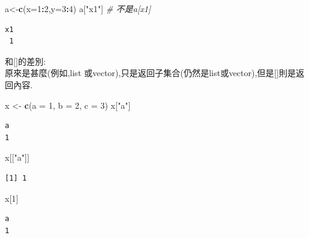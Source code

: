 \documentclass[]{book}
\newenvironment{Shaded}{\begin{snugshade}}{\end{snugshade}}
\newcommand{\CommentTok}[1]{\textcolor[rgb]{0.56,0.35,0.01}{\textit{#1}}}
\newcommand{\DataTypeTok}[1]{\textcolor[rgb]{0.13,0.29,0.53}{#1}}
\newcommand{\DecValTok}[1]{\textcolor[rgb]{0.00,0.00,0.81}{#1}}
\newcommand{\KeywordTok}[1]{\textcolor[rgb]{0.13,0.29,0.53}{\textbf{#1}}}
\newcommand{\NormalTok}[1]{#1}
\newcommand{\OperatorTok}[1]{\textcolor[rgb]{0.81,0.36,0.00}{\textbf{#1}}}
\newcommand{\StringTok}[1]{\textcolor[rgb]{0.31,0.60,0.02}{#1}}
\theoremstyle{definition}
\theoremstyle{definition}
\theoremstyle{definition}
\theoremstyle{remark}
\begin{document}
\begin{Shaded}
\begin{Highlighting}[]
\NormalTok{a<-}\KeywordTok{c}\NormalTok{(}\DataTypeTok{x=}\DecValTok{1}\OperatorTok{:}\DecValTok{2}\NormalTok{,}\DataTypeTok{y=}\DecValTok{3}\OperatorTok{:}\DecValTok{4}\NormalTok{)}
\NormalTok{a[}\StringTok{"x1"}\NormalTok{] }\CommentTok{# 不是a[x1]}
\end{Highlighting}
\end{Shaded}

\begin{verbatim}
x1 
 1 
\end{verbatim}

\protect\hyperlink{section-1}{}
和{[}\protect\hyperlink{section-1}{}{]}的差別:\\
原來是甚麼(例如,list
或vector),\protect\hyperlink{section-1}{}只是返回子集合(仍然是list或vector),但是{[}\protect\hyperlink{section-1}{}{]}則是返回內容.

\begin{Shaded}
\begin{Highlighting}[]
\NormalTok{x <-}\StringTok{ }\KeywordTok{c}\NormalTok{(}\DataTypeTok{a =} \DecValTok{1}\NormalTok{, }\DataTypeTok{b =} \DecValTok{2}\NormalTok{, }\DataTypeTok{c =} \DecValTok{3}\NormalTok{)}
\NormalTok{x[}\StringTok{"a"}\NormalTok{]}
\end{Highlighting}
\end{Shaded}

\begin{verbatim}
a 
1 
\end{verbatim}

\begin{Shaded}
\begin{Highlighting}[]
\NormalTok{x[[}\StringTok{"a"}\NormalTok{]]}
\end{Highlighting}
\end{Shaded}

\begin{verbatim}
[1] 1
\end{verbatim}

\begin{Shaded}
\begin{Highlighting}[]
\NormalTok{x[}\DecValTok{1}\NormalTok{]}
\end{Highlighting}
\end{Shaded}

\begin{verbatim}
a 
1 
\end{verbatim}
\end{document}
